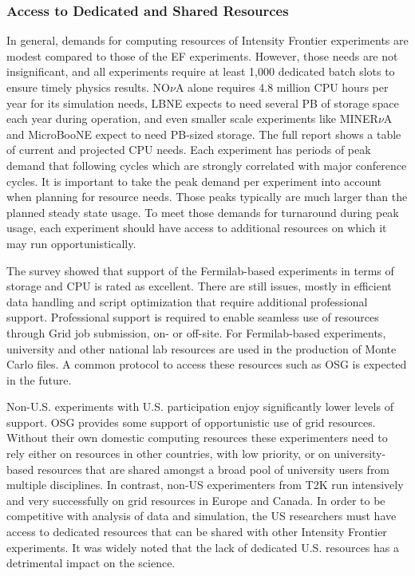 \subsubsection{Access to Dedicated and Shared Resources}
In general, demands for computing resources of Intensity Frontier experiments are modest compared to those of the EF
experiments.  However, those needs are not insignificant, and all experiments
require at least 1,000 dedicated batch slots to ensure timely physics results. 
NO$\nu$A alone requires 4.8 million
CPU hours per year for its simulation needs, LBNE expects to need
several PB of storage space each year during operation, and even smaller scale
experiments like MINER$\nu$A and MicroBooNE expect to need PB-sized storage.
The full report shows a table of current and projected CPU needs. Each
experiment has periods of peak demand that following cycles which are strongly correlated with
major conference cycles.  It is important to take the peak demand per
experiment into account when planning for resource needs. Those peaks
typically are much larger than the planned steady state usage. To meet those
demands for turnaround during peak usage, each experiment should have access to
additional resources on which it may run opportunistically.

The survey showed that support of the Fermilab-based experiments in terms of
storage and CPU is rated as excellent.  There are still issues, mostly in efficient data 
handling and script optimization that require additional professional support. Professional support is required to
enable seamless use of resources through Grid job submission, on- or off-site.
For Fermilab-based experiments, university and other national lab resources
are used in the production of Monte Carlo files. A common protocol to access
these resources such as OSG is expected in the future.

Non-U.S. experiments with U.S. participation enjoy significantly
lower levels of support. OSG provides some support of opportunistic use of
grid resources.  Without their own domestic computing resources these
experimenters need to rely either on resources in other countries, with low
priority, or on university-based resources that are shared amongst a broad
pool of university users from multiple disciplines. In contrast, non-US experimenters
from T2K run intensively and very successfully on grid resources in Europe and
Canada.  In order to be competitive with analysis of data and simulation, the US 
researchers must have access to dedicated resources that can
be shared with other Intensity Frontier experiments. It was widely noted that the lack of dedicated U.S.
resources has a detrimental impact on the science.


